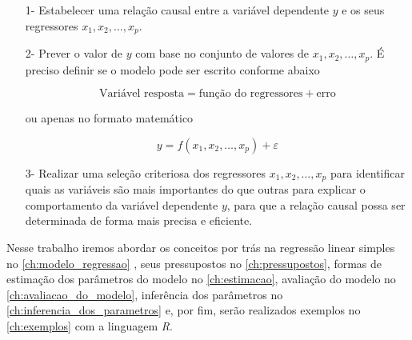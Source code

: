 \begin{itemize}
    \item[1-] Estabelecer uma relação causal entre a variável dependente $y$ e os seus regressores $x_1, x_2, \dots, x_p$. 
    
    \item[2-] Prever o valor de $y$ com base no conjunto de valores de  $x_1, x_2, \dots, x_p$. É preciso definir se o modelo pode ser escrito conforme abaixo
    
    $$
    \text{Variável resposta} = \text{função do regressores} + \text{erro}
    $$
    
    ou apenas no formato matemático
    
    $$
    y = f(x_1,x_2,\dots,x_p) + \varepsilon
    $$
    \item[3-] Realizar uma seleção criteriosa dos regressores  $x_1, x_2, \dots, x_p$ para identificar quais as variáveis são mais importantes do que outras para explicar o comportamento da variável dependente $y$, para que a relação causal possa ser determinada de forma mais precisa e eficiente.
    
\end{itemize}

\noindent Nesse trabalho iremos abordar os conceitos por trás na regressão linear simples no \autoref{ch:modelo_regressao} , seus pressupostos no \autoref{ch:pressupostos}, formas de estimação dos parâmetros do modelo no \autoref{ch:estimacao}, avaliação do modelo no \autoref{ch:avaliacao_do_modelo}, inferência dos parâmetros no \autoref{ch:inferencia_dos_parametros} e, por fim, serão realizados exemplos no \autoref{ch:exemplos} com a linguagem \textit{R}.








